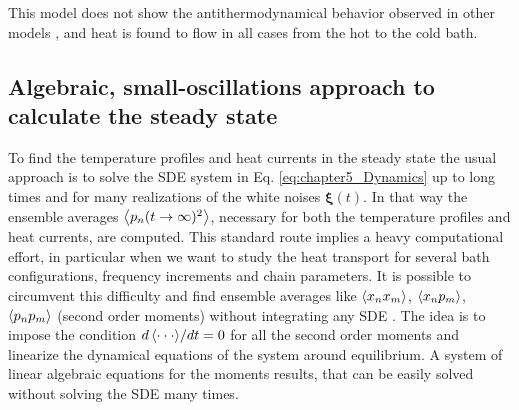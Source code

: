 This model does not show the antithermodynamical behavior  observed in other models
\cite{De-Chiara2018,Levy2014}, and heat is found to flow in all cases from the hot to the
cold bath.
%
%
%
\subsection{Algebraic, small-oscillations approach to calculate the steady state\label{sec:chapter5_steadyState}}
%
%
%
%
To find the temperature profiles and heat currents in the steady state the usual approach is to solve the SDE system in Eq. \eqref{eq:chapter5_Dynamics} up to long times  and for many realizations of the white noises $\bm\xi (t)$. In that way the ensemble averages $\expval{p_n(t \to \infty)^2}$, necessary for both the temperature profiles and heat currents, are computed. This standard route implies a heavy computational effort, in particular  when we want to study the heat transport for several bath configurations, frequency increments and chain parameters. It is possible to circumvent this difficulty and find ensemble averages like $\expval{x_n x_m}$, $\expval{x_n p_m}$, $\expval{p_n p_m}$ (second order moments) without integrating any SDE \cite{Sarkka2019,Rieder1967,Casher1971}. The idea is to impose the condition ${d\expval{\cdot\cdot\cdot}}/{dt} = 0$ for all the second order moments and linearize the dynamical equations of the system around equilibrium.
A system of linear algebraic equations for the moments results, that can be easily solved without solving the SDE many times.

